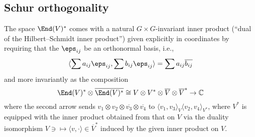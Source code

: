 \documentclass[reqno]{amsart} 
\begin{document}
\subsection{Schur orthogonality}\label{sec:schur-orthogonality}

\begin{definition}
  The space $\End(V)^*$ comes with a natural $G \times G$-invariant inner product (``dual of the Hilbert--Schmidt inner product'') given explicitly in coordinates by requiring that the $\eps_{i j}$ be an orthonormal basis, i.e.,
  \begin{equation*}
    \langle
    \sum a_{i j} \eps_{i j},
    \sum b_{i j} \eps_{i j}
    \rangle
    = \sum a_{i j} \overline{b_{i j}}
  \end{equation*}
  and more invariantly as the composition
  \begin{equation}
    \End(V)^* \otimes \overline{\End(V)^*}
    \cong V \otimes V^* \otimes \overline{V} \otimes
    \overline{V}^*
    \rightarrow \mathbb{C} 
  \end{equation}
  where the second arrow sends $v_1 \otimes v_2 \otimes \overline{v_3} \otimes \overline{v_4}$ to $\langle v_1, v_3 \rangle_V \langle v_2, v_4 \rangle_{V^*}$, where $V^*$ is equipped with the inner product obtained from that on $V$ via the duality isomorphism $V \ni \mapsto \langle v, \cdot \rangle \in \overline{V}^*$ induced by the given inner product on $V$.
\end{definition}
\end{document}
